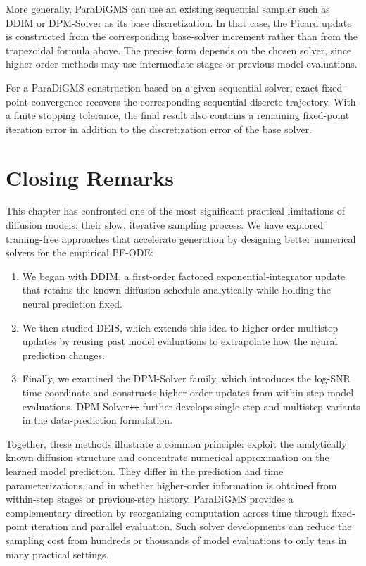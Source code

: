 More generally, ParaDiGMS can use an existing sequential sampler such as
DDIM or DPM-Solver as its base discretization. In that case, the Picard
update is constructed from the corresponding base-solver increment rather
than from the trapezoidal formula above. The precise form depends on the
chosen solver, since higher-order methods may use intermediate stages or
previous model evaluations.

For a ParaDiGMS construction based on a given sequential solver, exact
fixed-point convergence recovers the corresponding sequential discrete
trajectory. With a finite stopping tolerance, the final result also contains
a remaining fixed-point iteration error in addition to the discretization
error of the base solver.

\newpage
\section{Closing Remarks}\label{sec:ch9_cr}

This chapter has confronted one of the most significant practical limitations
of diffusion models: their slow, iterative sampling process. We have explored
training-free approaches that accelerate generation by designing better
numerical solvers for the empirical PF-ODE:
\begin{enumerate}
    \item We began with DDIM, a first-order factored exponential-integrator
    update that retains the known diffusion schedule analytically while
    holding the neural prediction fixed.
    \item We then studied DEIS, which extends this idea to higher-order
    multistep updates by reusing past model evaluations to extrapolate how the
    neural prediction changes.
    \item Finally, we examined the DPM-Solver family, which introduces the
    log-SNR time coordinate and constructs higher-order updates from
    within-step model evaluations. DPM-Solver\texttt{++} further develops
    single-step and multistep variants in the data-prediction formulation.
\end{enumerate}

Together, these methods illustrate a common principle: exploit the analytically
known diffusion structure and concentrate numerical approximation on the
learned model prediction. They differ in the prediction and time
parameterizations, and in whether higher-order information is obtained from
within-step stages or previous-step history. ParaDiGMS provides a complementary
direction by reorganizing computation across time through fixed-point
iteration and parallel evaluation. Such solver developments can reduce the
sampling cost from hundreds or thousands of model evaluations to only tens in
many practical settings.

